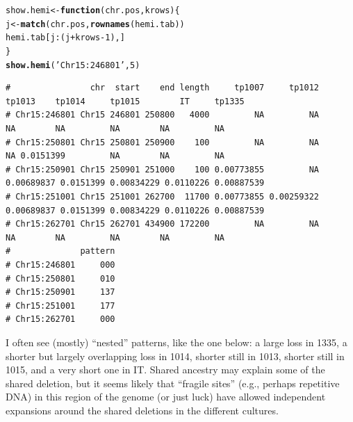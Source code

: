 \documentclass{article}\usepackage[]{graphicx}\usepackage[]{color}
\makeatletter
\newcommand{\hlnum}[1]{\textcolor[rgb]{0.686,0.059,0.569}{#1}}%
\newcommand{\hlstr}[1]{\textcolor[rgb]{0.192,0.494,0.8}{#1}}%
\newcommand{\hlopt}[1]{\textcolor[rgb]{0,0,0}{#1}}%
\newcommand{\hlstd}[1]{\textcolor[rgb]{0.345,0.345,0.345}{#1}}%
\newcommand{\hlkwa}[1]{\textcolor[rgb]{0.161,0.373,0.58}{\textbf{#1}}}%
\newcommand{\hlkwb}[1]{\textcolor[rgb]{0.69,0.353,0.396}{#1}}%
\newcommand{\hlkwc}[1]{\textcolor[rgb]{0.333,0.667,0.333}{#1}}%
\newcommand{\hlkwd}[1]{\textcolor[rgb]{0.737,0.353,0.396}{\textbf{#1}}}%
\newenvironment{kframe}{%
 \def\at@end@of@kframe{}%
 \ifinner\ifhmode%
  \def\at@end@of@kframe{\end{minipage}}%
  \begin{minipage}{\columnwidth}%
 \fi\fi%
 \def\FrameCommand##1{\hskip\@totalleftmargin \hskip-\fboxsep
 \colorbox{shadecolor}{##1}\hskip-\fboxsep
     \hskip-\linewidth \hskip-\@totalleftmargin \hskip\columnwidth}%
 \MakeFramed {\advance\hsize-\width
   \@totalleftmargin\z@ \linewidth\hsize
   \@setminipage}}%
 {\par\unskip\endMakeFramed%
 \at@end@of@kframe}
\newenvironment{knitrout}{}{} %
\makeatother
\begin{document}
\begin{knitrout}\scriptsize
{}\color{fgcolor}\begin{kframe}
\begin{alltt}
\hlstd{show.hemi} \hlkwb{<-} \hlkwa{function}\hlstd{(}\hlkwc{chr.pos}\hlstd{,}\hlkwc{krows}\hlstd{)\{}
  \hlstd{j} \hlkwb{<-} \hlkwd{match}\hlstd{(chr.pos,}\hlkwd{rownames}\hlstd{(hemi.tab))}
  \hlstd{hemi.tab[j}\hlopt{:}\hlstd{(j}\hlopt{+}\hlstd{krows}\hlopt{-}\hlnum{1}\hlstd{),]}
\hlstd{\}}
\hlkwd{show.hemi}\hlstd{(}\hlstr{'Chr15:246801'}\hlstd{,}\hlnum{5}\hlstd{)}
\end{alltt}
\begin{verbatim}
#                chr  start    end length     tp1007     tp1012     tp1013    tp1014     tp1015        IT     tp1335
# Chr15:246801 Chr15 246801 250800   4000         NA         NA         NA        NA         NA        NA         NA
# Chr15:250801 Chr15 250801 250900    100         NA         NA         NA 0.0151399         NA        NA         NA
# Chr15:250901 Chr15 250901 251000    100 0.00773855         NA 0.00689837 0.0151399 0.00834229 0.0110226 0.00887539
# Chr15:251001 Chr15 251001 262700  11700 0.00773855 0.00259322 0.00689837 0.0151399 0.00834229 0.0110226 0.00887539
# Chr15:262701 Chr15 262701 434900 172200         NA         NA         NA        NA         NA        NA         NA
#              pattern
# Chr15:246801     000
# Chr15:250801     010
# Chr15:250901     137
# Chr15:251001     177
# Chr15:262701     000
\end{verbatim}
\end{kframe}
\end{knitrout}

I often see (mostly) ``nested'' patterns, like the one below: a large loss in 1335, a shorter but largely overlapping loss in 1014, shorter still in 1013, shorter still in 1015, and a very short one in IT.  Shared ancestry may explain some of the shared deletion, but it seems likely that ``fragile sites'' (e.g., perhaps repetitive DNA) in this region of the genome (or just luck) have allowed independent expansions around the shared deletions in the different cultures.
\end{document}
